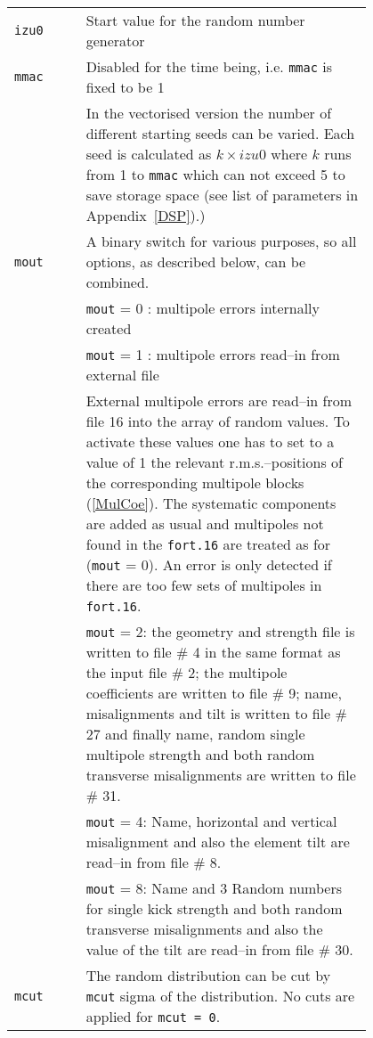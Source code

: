 \bigskip
\begin{tabular}{@{}lp{0.8\linewidth}}
    \texttt{izu0} & Start value for the random number generator \\
    \texttt{mmac} & {\color{notered} Disabled for the time being, i.e. \texttt{mmac} is fixed to be 1} \\
                  & In the vectorised version the number of different starting seeds can be varied. Each seed is calculated as \mbox{$ k \times izu0 $} where $k$ runs from 1 to \texttt{mmac} which can not exceed 5 to save storage space (see    list of parameters in Appendix~\ref{DSP}).) \\
    \texttt{mout} & A binary switch for various purposes, so all options, as described below, can be combined. \\
                  & \texttt{mout} = 0 : multipole errors internally created \\
                  & \texttt{mout} = 1 : multipole errors read--in from external file \\
                  & External multipole errors are read--in from file 16 into the array of random values. To activate these values one has to set to a value of 1 the relevant r.m.s.--positions of the corresponding multipole blocks (\ref{MulCoe}). The systematic components are added as usual and multipoles not found in the \texttt{fort.16} are treated as for (\texttt{mout} = 0). An error is only detected if there are too few sets of multipoles in \texttt{fort.16}. \\
                  & \texttt{mout} = 2: the geometry and strength file is written to file \# 4 in the same format as the input file \# 2; the multipole coefficients are written to file \# 9; name, misalignments and tilt is written to file \# 27 and finally name, random single multipole  strength and both random transverse misalignments are written to  file \# 31.\\
                  & \texttt{mout} = 4: Name, horizontal and vertical misalignment and also the element tilt are read--in from file \# 8.\\
                  & \texttt{mout} = 8: Name and 3 Random numbers for single kick strength and both random transverse misalignments and also the value of the tilt are read--in from file \# 30. \\
    \texttt{mcut} & The random distribution can be cut by \texttt{mcut} sigma of the distribution. No cuts are applied for \texttt{mcut = 0}.
\end{tabular}

